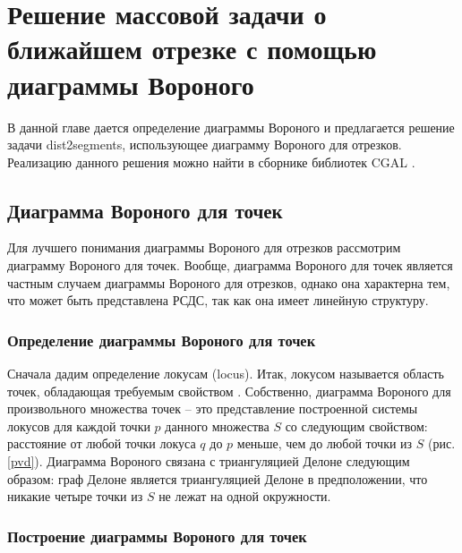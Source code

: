 \chapter{Решение массовой задачи о ближайшем отрезке с помощью диаграммы Вороного}
\label{chapSVD}

В данной главе дается определение диаграммы Вороного и предлагается
решение задачи dist2segments, использующее диаграмму Вороного для
отрезков. Реализацию данного решения можно найти в сборнике библиотек
CGAL \cite{CGAL}.

\FloatBarrier
\section{Диаграмма Вороного для точек}

Для лучшего понимания диаграммы Вороного для отрезков рассмотрим
диаграмму Вороного для точек. Вообще, диаграмма Вороного для точек
является частным случаем диаграммы
Вороного для отрезков, однако она
характерна тем, что может быть представлена РСДС, так как она имеет
линейную структуру.

\FloatBarrier
\subsection{Определение диаграммы Вороного для точек}

Сначала дадим определение локусам (locus). Итак, локусом называется
область точек, обладающая требуемым свойством \cite{PrSh}. Собственно, диаграмма
Вороного для произвольного множества точек -- это представление
построенной системы локусов для каждой точки $p$ данного множества $S$ со
следующим свойством: расстояние от любой точки локуса $q$ до $p$ меньше, чем
до любой точки из $S$ (рис. \ref{pvd}). Диаграмма Вороного связана с триангуляцией Делоне \cite{PrSh, CGAL} следующим
образом: граф Делоне является триангуляцией Делоне в предположении, что
никакие четыре точки из $S$ не лежат на одной окружности.


\FloatBarrier
\subsection{Построение диаграммы Вороного для точек}


